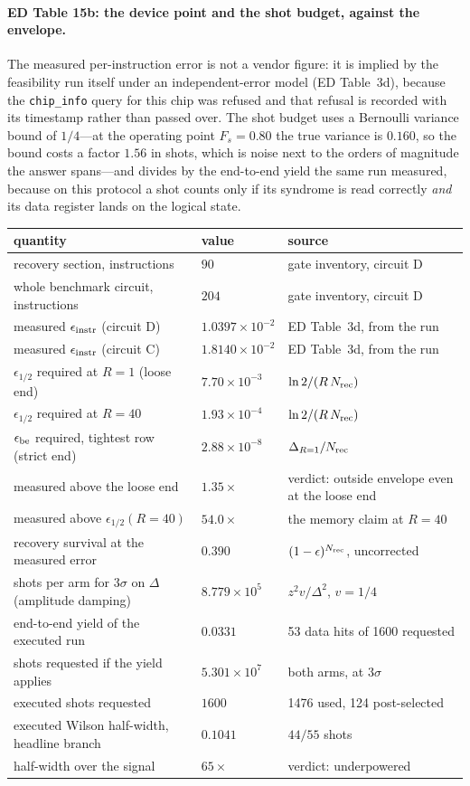 \documentclass[10pt,a4paper]{article}
\begin{document}
\paragraph*{ED Table 15b: the device point and the shot budget, against the envelope.}
The measured per-instruction error is not a vendor figure: it is implied by the
feasibility run itself under an independent-error model (ED Table~3d), because the
\texttt{chip\_info} query for this chip was refused and that refusal is recorded with
its timestamp rather than passed over.  The shot budget uses a Bernoulli variance
bound of $1/4$---at the operating point $F_s=0.80$ the true variance is $0.160$, so
the bound costs a factor $1.56$ in shots, which is noise next to the orders of
magnitude the answer spans---and divides by the end-to-end yield the same run
measured, because on this protocol a shot counts only if its syndrome is read
correctly \emph{and} its data register lands on the logical state.
\begin{longtable}{lll}
\toprule quantity & value & source \\ \midrule
recovery section, instructions & $90$ & gate inventory, circuit D \\
whole benchmark circuit, instructions & $204$ & gate inventory, circuit D \\
measured $\epsilon_{\rm instr}$ (circuit D) & $1.0397\times 10^{-2}$ & ED Table~3d, from the run \\
measured $\epsilon_{\rm instr}$ (circuit C) & $1.8140\times 10^{-2}$ & ED Table~3d, from the run \\
$\epsilon_{1/2}$ required at $R=1$ (loose end) & $7.70\times 10^{-3}$ & $\ln2/(R\,N_{\rm rec})$ \\
$\epsilon_{1/2}$ required at $R=40$ & $1.93\times 10^{-4}$ & $\ln2/(R\,N_{\rm rec})$ \\
$\epsilon_{\rm be}$ required, tightest row (strict end) & $2.88\times 10^{-8}$ & $\Delta_{R=1}/N_{\rm rec}$ \\
measured above the loose end & $1.35\times$ & verdict: outside envelope even at the loose end \\
measured above $\epsilon_{1/2}(R{=}40)$ & $54.0\times$ & the memory claim at $R=40$ \\
recovery survival at the measured error & $0.390$ & $(1-\epsilon)^{N_{\rm rec}}$, uncorrected \\
shots per arm for $3\sigma$ on $\Delta$ (amplitude damping) & $8.779\times 10^{5}$ & $z^2 v/\Delta^2$, $v=1/4$ \\
end-to-end yield of the executed run & $0.0331$ & 53 data hits of 1600 requested \\
shots requested if the yield applies & $5.301\times 10^{7}$ & both arms, at $3\sigma$ \\
executed shots requested & $1600$ & 1476 used, 124 post-selected \\
executed Wilson half-width, headline branch & $0.1041$ & $44/55$ shots \\
half-width over the signal & $65\times$ & verdict: underpowered \\
\bottomrule\end{longtable}
\end{document}
